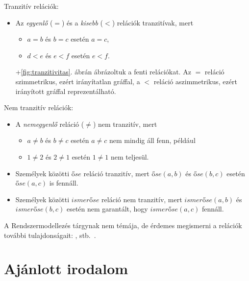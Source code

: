 \begin{pelda}

	Tranzitív relációk:
	\begin{itemize}
	\item Az \emph{egyenlő} ($=$) és a \emph{kisebb} ($<$) relációk tranzitívak, mert
	\begin{itemize}
		\item $a = b$ és $b = c$ esetén $a = c$,
		\item $d < e$ és $e < f$ esetén $e < f$.
	\end{itemize}
	\Az+\ref{fig:tranzitivitas}. ábrán ábrázoltuk a fenti relációkat. Az $=$ reláció szimmetrikus, ezért irányítatlan gráffal, a $<$ reláció aszimmetrikus, ezért irányított gráffal reprezentálható.
	\end{itemize}
	
	Nem tranzitív relációk:
	\begin{itemize}
	\item A \emph{nemegyenlő} reláció ($\neq$) nem tranzitív, mert 
	\begin{itemize}
		\item $a \neq b$ és $b \neq c$ esetén $a \neq c$ nem mindig áll fenn, például
		\item $1 \neq 2$ és $2 \neq 1$ esetén $1 \neq 1$ nem teljesül.
	\end{itemize}
	\item Személyek közötti $\mathit{őse}$ reláció tranzitív, mert $\mathit{őse}(a, b)$ és $\mathit{őse}(b, c)$ esetén $\mathit{őse}(a, c)$ is fennáll. 
	\item Személyek közötti $\mathit{ismerőse}$ reláció nem tranzitív, mert $\mathit{ismerőse}(a, b)$ és $\mathit{ismerőse}(b, c)$ esetén nem garantált, hogy $\mathit{ismerőse}(a, c)$ fennáll.
	\end{itemize}
\end{pelda}


A Rendszermodellezés tárgynak nem témája, de érdemes megismerni a relációk további tulajdonságait: ,  stb.~\cite{wiki:relacio}. 


\section{Ajánlott irodalom}

